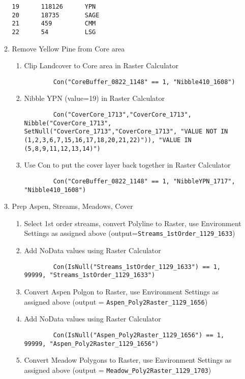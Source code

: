 \begin{enumerate}
\begin{enumerate}
\begin{verbatim}
19      118126      YPN
20      18735       SAGE
21      459         CMM
22      54          LSG
    \end{verbatim}
    \item Remove Yellow Pine from Core area
        \begin{enumerate}
        \item Clip Landcover to Core area in Raster Calculator 
        \begin{lstlisting}
        Con("CoreBuffer_0822_1148" == 1, "Nibble410_1608") 
        \end{lstlisting}
        \item Nibble YPN (value=19) in Raster Calculator \begin{lstlisting}
        Con("CoverCore_1713","CoverCore_1713", Nibble("CoverCore_1713", SetNull("CoverCore_1713","CoverCore_1713", "VALUE NOT IN (1,2,3,6,7,15,16,17,18,20,21,22)")), "VALUE IN (5,8,9,11,12,13,14)") \end{lstlisting}
        \item Use Con to put the cover layer back together in Raster Calculator \begin{lstlisting}
        Con("CoreBuffer_0822_1148" == 1, "NibbleYPN_1717", "Nibble410_1608")\end{lstlisting}
        \end{enumerate}
    \item Prep Aspen, Streams, Meadows, Cover
        \begin{enumerate}
        \item Select 1st order streams, convert Polyline to Raster, use Environment Settings as assigned above (output=\lstinline{Streams_1stOrder_1129_1633})
        \item Add NoData values using Raster Calculator \begin{lstlisting}
        Con(IsNull("Streams_1stOrder_1129_1633") == 1, 99999, "Streams_1stOrder_1129_1633") \end{lstlisting}
        \item Convert Aspen Polgon to Raster, use Environment Settings as assigned above (output = \lstinline{Aspen_Poly2Raster_1129_1656})
        \item Add NoData values using Raster Calculator \begin{lstlisting}
        Con(IsNull("Aspen_Poly2Raster_1129_1656") == 1, 99999, "Aspen_Poly2Raster_1129_1656") \end{lstlisting}
        \item Convert Meadow Polygons to Raster, use Environment Settings as assigned above (output = \lstinline{Meadow_Poly2Raster_1129_1703})

\end{enumerate}
\end{enumerate}
\end{enumerate}
